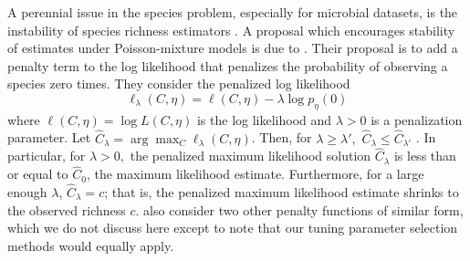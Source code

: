 \documentclass[oupdraft]{bio}
\begin{document}
A perennial issue in the species problem, especially for microbial datasets, is the instability of species richness estimators \citep{Rocchetti:2011tv,willis_2015}.
%
%
%
A proposal which encourages stability of estimates under Poisson-mixture models is due to \citet{wang_2005}.  Their proposal is to add a penalty term to the log likelihood that penalizes the probability of observing a species zero times. They consider the
penalized log likelihood
\begin{equation}
\ell_\lambda(C, \eta) = \ell(C,\eta) - \lambda \log p_{\eta}(0)
\label{eq:wang_lindsay}
\end{equation}
where $\ell(C,\eta) = \log L(C, \eta)$ is the log likelihood and $\lambda > 0$ is a penalization parameter.
Let $\hat{C}_\lambda = \arg \max_{C} \ell_\lambda(C, \eta)$.
Then, for $\lambda \geq \lambda',$ $\hat{C}_\lambda \leq \hat{C}_{\lambda'}$ \citep[Theorem 1]{wang_2005}. In particular, for $\lambda > 0,$ the penalized maximum likelihood solution $\hat{C}_\lambda$ is less than or equal to $\hat{C}_0$, the maximum likelihood estimate. Furthermore, for a large enough $\lambda$, $\hat{C}_\lambda = c$; that is, the penalized maximum likelihood estimate shrinks to the observed richness $c$.
\citet{wang_2005} also consider two other penalty functions of similar form, which we do not discuss here except to note that our tuning parameter selection methods would equally apply.
\end{document}
